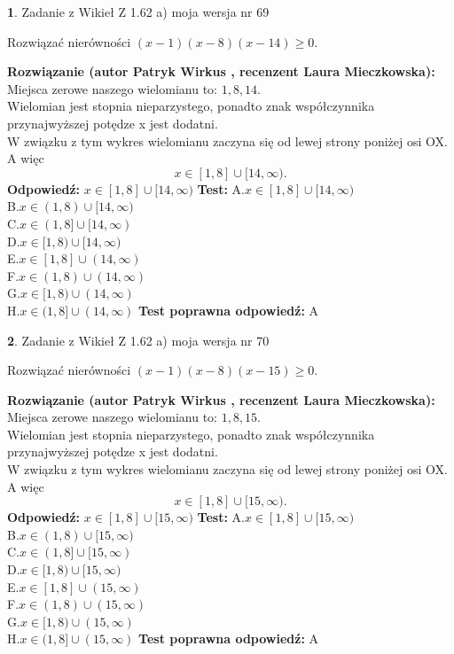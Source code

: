 \documentclass[12pt, a4paper]{article}
\theoremstyle{definition} %
\newtheorem{zad}{}
\newcommand{\zadStart}[1]{\begin{zad}#1\newline}
\newcommand{\zadStop}{\end{zad}}
\newcommand{\rozwStart}[2]{\noindent \textbf{Rozwiązanie (autor #1 , recenzent #2): }\newline}
\newcommand{\rozwStop}{\newline}
\newcommand{\odpStart}{\noindent \textbf{Odpowiedź:}\newline}
\newcommand{\odpStop}{\newline}
\newcommand{\testStart}{\noindent \textbf{Test:}\newline}
\newcommand{\testStop}{\newline}
\newcommand{\kluczStart}{\noindent \textbf{Test poprawna odpowiedź:}\newline}
\newcommand{\kluczStop}{\newline}
\begin{document}
\zadStart{Zadanie z Wikieł Z 1.62 a) moja wersja nr 69}

Rozwiązać nierówności $(x-1)(x-8)(x-14)\ge0$.
\zadStop
\rozwStart{Patryk Wirkus}{Laura Mieczkowska}
Miejsca zerowe naszego wielomianu to: $1, 8, 14$.\\
Wielomian jest stopnia nieparzystego, ponadto znak współczynnika przy\linebreak najwyższej potędze x jest dodatni.\\ W związku z tym wykres wielomianu zaczyna się od lewej strony poniżej osi OX. A więc $$x \in [1,8] \cup [14,\infty).$$
\rozwStop
\odpStart
$x \in [1,8] \cup [14,\infty)$
\odpStop
\testStart
A.$x \in [1,8] \cup [14,\infty)$\\
B.$x \in (1,8) \cup [14,\infty)$\\
C.$x \in (1,8] \cup [14,\infty)$\\
D.$x \in [1,8) \cup [14,\infty)$\\
E.$x \in [1,8] \cup (14,\infty)$\\
F.$x \in (1,8) \cup (14,\infty)$\\
G.$x \in [1,8) \cup (14,\infty)$\\
H.$x \in (1,8] \cup (14,\infty)$
\testStop
\kluczStart
A
\kluczStop



\zadStart{Zadanie z Wikieł Z 1.62 a) moja wersja nr 70}

Rozwiązać nierówności $(x-1)(x-8)(x-15)\ge0$.
\zadStop
\rozwStart{Patryk Wirkus}{Laura Mieczkowska}
Miejsca zerowe naszego wielomianu to: $1, 8, 15$.\\
Wielomian jest stopnia nieparzystego, ponadto znak współczynnika przy\linebreak najwyższej potędze x jest dodatni.\\ W związku z tym wykres wielomianu zaczyna się od lewej strony poniżej osi OX. A więc $$x \in [1,8] \cup [15,\infty).$$
\rozwStop
\odpStart
$x \in [1,8] \cup [15,\infty)$
\odpStop
\testStart
A.$x \in [1,8] \cup [15,\infty)$\\
B.$x \in (1,8) \cup [15,\infty)$\\
C.$x \in (1,8] \cup [15,\infty)$\\
D.$x \in [1,8) \cup [15,\infty)$\\
E.$x \in [1,8] \cup (15,\infty)$\\
F.$x \in (1,8) \cup (15,\infty)$\\
G.$x \in [1,8) \cup (15,\infty)$\\
H.$x \in (1,8] \cup (15,\infty)$
\testStop
\kluczStart
A
\kluczStop
\end{document}
